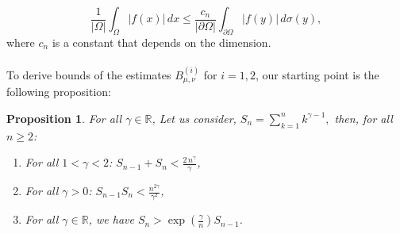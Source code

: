 \documentclass[11pt]{amsart}
\newtheorem{prop}[thm]{Proposition}
\newcommand{\1}{[1]}
\begin{document}
    $$
    \frac{1}{|\Omega|} \int_\Omega |f(x)| \, dx \leq \frac{c_{n}}{|\partial \Omega|} \int_{\partial \Omega} |f(y)| \, d\sigma(y),
    $$
where $c_n$ is a constant that depends on the dimension.  \\ \\
To derive bounds of the estimates $B_{\mu,\nu}^{(i)}$ for \( i = 1, 2 \), our starting point is the following proposition:
\begin{prop} \label{prop 4.1} For all $\gamma \in \mathbb{R}$, Let us consider, $\displaystyle S_n = \sum_{k=1}^n k^{\gamma - 1},
$ then, for all $n \geq 2$:
\begin{enumerate}
    \item[\textit{ i)}] For all  $1 < \gamma < 2$: $S_{n-1} + S_n < \frac{2 \, n^{\gamma}}{\gamma}$,
    \item[\textit{ ii)}] For all $\gamma > 0$: $S_{n-1} S_n < \frac{n^{2 \gamma}}{\gamma^2}$,
    \item[\textit{iii)}] For all  $\gamma \in \mathbb{R}$, we have $S_n > \exp\left(\frac{\gamma}{n}\right) S_{n-1}$.
\end{enumerate}
\end{prop}
\end{document}
